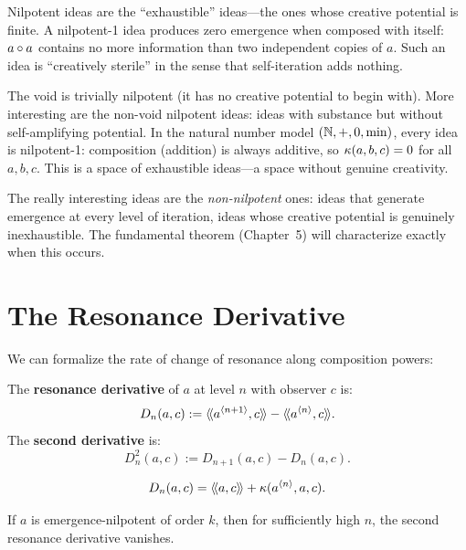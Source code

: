 \begin{interpretation}
Nilpotent ideas are the ``exhaustible'' ideas---the ones whose creative potential
is finite. A nilpotent-1 idea produces zero emergence when composed with itself:
$a \circ a$ contains no more information than two independent copies of $a$.
Such an idea is ``creatively sterile'' in the sense that self-iteration adds
nothing.

The void is trivially nilpotent (it has no creative potential to begin with).
More interesting are the non-void nilpotent ideas: ideas with substance but
without self-amplifying potential. In the natural number model $(\mathbb{N}, +, 0, \min)$,
every idea is nilpotent-1: composition (addition) is always additive, so
$\kappa(a,b,c) = 0$ for all $a, b, c$. This is a space of exhaustible ideas---a
space without genuine creativity.

The really interesting ideas are the \emph{non-nilpotent} ones: ideas that
generate emergence at every level of iteration, ideas whose creative potential
is genuinely inexhaustible. The fundamental theorem (Chapter~5) will
characterize exactly when this occurs.
\end{interpretation}


\section{The Resonance Derivative}

We can formalize the rate of change of resonance along composition powers:

\begin{definition}
The \textbf{resonance derivative} of $a$ at level $n$ with observer $c$ is:
\[
  D_n(a, c) := \langle\!\langle a^{\langle n+1 \rangle}, c \rangle\!\rangle - \langle\!\langle a^{\langle n \rangle}, c \rangle\!\rangle.
\]
The \textbf{second derivative} is:
\[
  D^2_n(a, c) := D_{n+1}(a,c) - D_n(a,c).
\]
\end{definition}

\begin{theorem}
\label{thm:resonance-derivative}
\[
  D_n(a, c) = \langle\!\langle a, c \rangle\!\rangle + \kappa(a^{\langle n \rangle}, a, c).
\]
\end{theorem}

\begin{theorem}
\label{thm:nilpotent-second-derivative}
If $a$ is emergence-nilpotent of order $k$, then for sufficiently high $n$,
the second resonance derivative vanishes.
\end{theorem}

